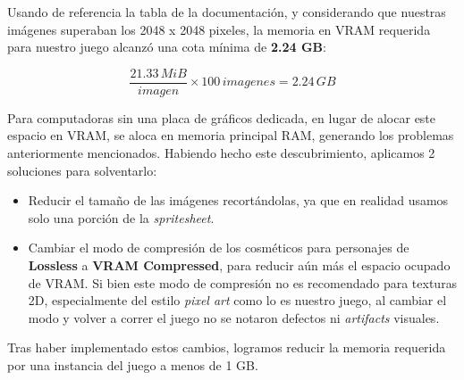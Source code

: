 Usando de referencia la tabla de la documentación, y considerando que nuestras imágenes superaban
los 2048 x 2048 pixeles, la memoria en VRAM requerida para nuestro juego alcanzó una cota mínima de 
\textbf{2.24 GB}:

\[
\frac{21.33 \, MiB}{imagen} \times 100 \, imagenes = 2.24 \, GB
\]

Para computadoras sin una placa de gráficos dedicada, en lugar de alocar este espacio en VRAM,
se aloca en memoria principal RAM, generando los problemas anteriormente mencionados.
Habiendo hecho este descubrimiento, aplicamos 2 soluciones para solventarlo:

\begin{itemize}
    \item Reducir el tamaño de las imágenes recortándolas, ya que en realidad usamos solo
    una porción de la \textit{spritesheet}.
    \item Cambiar el modo de compresión de los cosméticos para personajes de \textbf{Lossless}
    a \textbf{VRAM Compressed}, para reducir aún más el espacio ocupado de VRAM. Si bien este
    modo de compresión no es recomendado para texturas 2D, especialmente del estilo
    \textit{pixel art} como lo es nuestro juego, al cambiar el modo y volver a correr el juego
    no se notaron defectos ni \textit{artifacts} visuales.
\end{itemize}

Tras haber implementado estos cambios, logramos reducir la memoria requerida por una instancia
del juego a menos de 1 GB.
